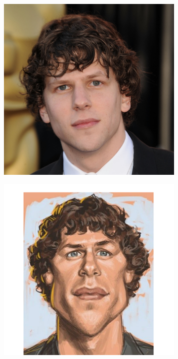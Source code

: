 \documentclass[a4paper]{article}
\begin{document}
\begin{figure}[H]
    \centering
    \begin{subfigure}{0.3\textwidth}
        \includegraphics[width=\textwidth]{../input/jesse_eisenberg.png}
    \end{subfigure}
    \begin{subfigure}{0.3\textwidth}
        \includegraphics[width=\textwidth]{../input/caricuture.png}

\end{subfigure}
\end{figure}
\end{document}
